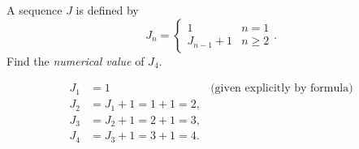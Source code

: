 \documentclass[12pt,fleqn,answers]{exam}
\begin{document}
\begin{questions}
\begin{parts}
\begin{solution}[3.0in]
    \end{solution}




\end{parts}

\question A sequence $J$ is defined by 
\begin{equation*}
   J_n = \begin{cases} 1 & n=1 \\ J_{n-1} + 1 & n \geq 2 \end{cases}.
\end{equation*}
Find the \emph{numerical value} of $J_4$.

\begin{solution}
  \begin{align*}
    J_1 &= 1 &\mbox{(given explicitly by formula)} \\
    J_2 &= J_1 + 1 = 1 + 1 = 2, \\
    J_3 &= J_2 + 1 = 2 + 1 = 3, \\
    J_4 &= J_3 + 1 = 3 + 1 = 4.
  \end{align*}

\end{solution}

\end{questions}

\end{document}

